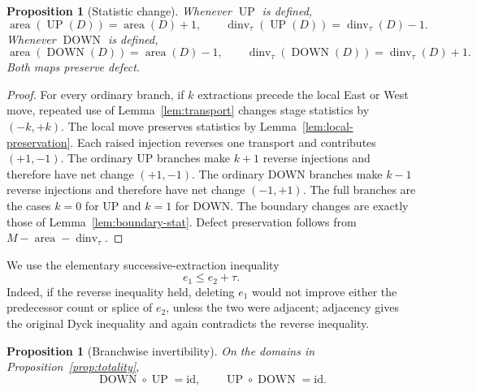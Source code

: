 \documentclass[11pt]{article}
\newtheorem{proposition}[theorem]{Proposition}
\theoremstyle{definition}
\theoremstyle{remark}
\newcommand{\area}{\operatorname{area}}
\newcommand{\dinv}{\operatorname{dinv}}
\newcommand{\UP}{\operatorname{UP}}
\newcommand{\DOWN}{\operatorname{DOWN}}
\begin{document}
\begin{proposition}[Statistic change]
\label{prop:statistics}
Whenever $\UP$ is defined,
\[
 \area(\UP(D))=\area(D)+1,
 \qquad
 \dinv_\tau(\UP(D))=\dinv_\tau(D)-1.
\]
Whenever $\DOWN$ is defined,
\[
 \area(\DOWN(D))=\area(D)-1,
 \qquad
 \dinv_\tau(\DOWN(D))=\dinv_\tau(D)+1.
\]
Both maps preserve defect.
\end{proposition}

\begin{proof}
For every ordinary branch, if $k$ extractions precede the local East or West
move, repeated use of Lemma~\ref{lem:transport} changes stage statistics by
$(-k,+k)$.  The local move preserves statistics by
Lemma~\ref{lem:local-preservation}.  Each raised injection reverses one
transport and contributes $(+1,-1)$.  The ordinary UP branches make $k+1$
reverse injections and therefore have net change $(+1,-1)$.  The ordinary
DOWN branches make $k-1$ reverse injections and therefore have net change
$(-1,+1)$.  The full branches are the cases $k=0$ for UP and $k=1$ for
DOWN.  The boundary changes are exactly those of
Lemma~\ref{lem:boundary-stat}.  Defect preservation follows from
$M-\area-\dinv_\tau$.
\end{proof}

We use the elementary successive-extraction inequality
\begin{equation}
 e_1\le e_2+\tau.
 \label{eq:successive-extraction-s5}
\end{equation}
Indeed, if the reverse inequality held, deleting $e_1$ would not improve
either the predecessor count or splice of $e_2$, unless the two were
adjacent; adjacency gives the original Dyck inequality and again contradicts
the reverse inequality.

\begin{proposition}[Branchwise invertibility]
\label{prop:inverse}
On the domains in Proposition~\ref{prop:totality},
\[
 \DOWN\circ\UP=\mathrm{id},
 \qquad
 \UP\circ\DOWN=\mathrm{id}.
\]
\end{proposition}
\end{document}
